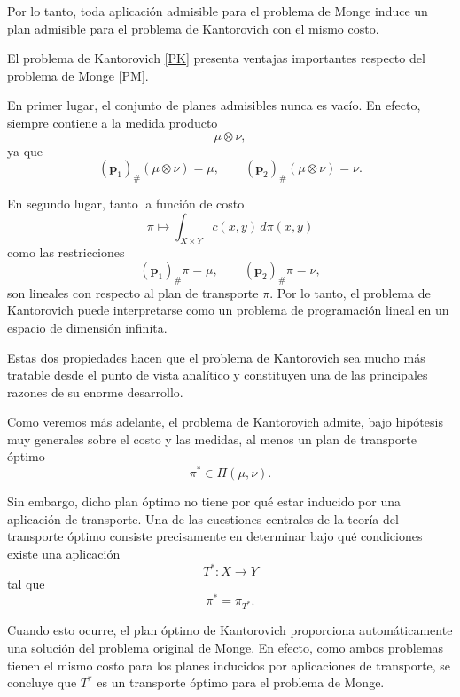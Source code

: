 \documentclass[12pt, a4paper]{amsbook}
\newcommand{\pp}{{\mathbf p}}
\theoremstyle{remark}
\theoremstyle{definition}
\numberwithin{section}{chapter}
\numberwithin{subsection}{section}
\numberwithin{equation}{section}
\numberwithin{figure}{chapter}
\begin{document}
Por lo tanto, toda aplicación admisible para el problema de Monge induce un plan admisible para el problema de Kantorovich con el mismo costo.

El problema de Kantorovich \eqref{PK} presenta ventajas importantes respecto del problema de Monge \eqref{PM}.

En primer lugar, el conjunto de planes admisibles nunca es vacío. En efecto, siempre contiene a la medida producto
\[
\mu\otimes\nu,
\]
ya que
\[
(\pp_1)_\#(\mu\otimes\nu)=\mu,
\qquad
(\pp_2)_\#(\mu\otimes\nu)=\nu.
\]

En segundo lugar, tanto la función de costo
\[
\pi\mapsto
\int_{X\times Y} c(x,y)\,d\pi(x,y)
\]
como las restricciones
\[
(\pp_1)_\#\pi=\mu,
\qquad
(\pp_2)_\#\pi=\nu,
\]
son lineales con respecto al plan de transporte \(\pi\). Por lo tanto, el problema de Kantorovich puede interpretarse como un problema de programación lineal en un espacio de dimensión infinita.

Estas dos propiedades hacen que el problema de Kantorovich sea mucho más tratable desde el punto de vista analítico y constituyen una de las principales razones de su enorme desarrollo.

Como veremos más adelante, el problema de Kantorovich admite, bajo hipótesis muy generales sobre el costo y las medidas, al menos un plan de transporte óptimo
\[
\pi^*\in\Pi(\mu,\nu).
\]

Sin embargo, dicho plan óptimo no tiene por qué estar inducido por una aplicación de transporte. Una de las cuestiones centrales de la teoría del transporte óptimo consiste precisamente en determinar bajo qué condiciones existe una aplicación
\[
T^*\colon X\to Y
\]
tal que
\[
\pi^*=\pi_{T^*}.
\]

Cuando esto ocurre, el plan óptimo de Kantorovich proporciona automáticamente una solución del problema original de Monge. En efecto, como ambos problemas tienen el mismo costo para los planes inducidos por aplicaciones de transporte, se concluye que \(T^*\) es un transporte óptimo para el problema de Monge.
\end{document}
